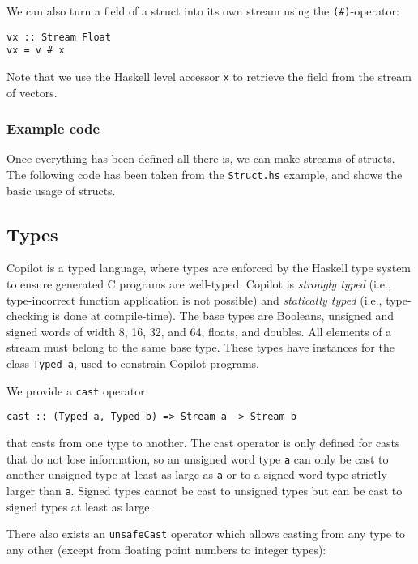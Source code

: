 We can also turn a field of a struct into its own stream using the
\texttt{(\#)}-operator:
\begin{lstlisting}[language=Copilot]
vx :: Stream Float
vx = v # x
\end{lstlisting}
Note that we use the Haskell level accessor \texttt{x} to retrieve the field
from the stream of vectors.


\subsubsection*{Example code}
\label{exm:struct}
Once everything has been defined all there is, we can make streams of structs. The following
code has been taken from the \texttt{Struct.hs} example, and shows the basic
usage of structs.
%

%

\subsection{Types} \label{sec:types}

Copilot is a typed language, where types are enforced by the Haskell type system
to ensure generated C programs are well-typed.  Copilot is \emph{strongly typed}
(i.e., type-incorrect function application is not possible) and \emph{statically
  typed} (i.e., type-checking is done at compile-time).  The base types are
Booleans, unsigned and signed words of width 8, 16, 32, and 64, floats, and
doubles.  All elements of a stream must belong to the same base
type.  These types have instances for the class {\tt Typed a}, used to constrain
Copilot programs.

We provide a {\tt cast} operator
%
\begin{lstlisting}[language = Copilot, frame = single]
cast :: (Typed a, Typed b) => Stream a -> Stream b
\end{lstlisting}
%
that casts from one type to another.  The cast operator is only defined for
casts that do not lose information, so an unsigned word type {\tt a} can only be
cast to another unsigned  type at least as large as {\tt a} or to a signed word
type strictly larger than {\tt a}.  Signed types cannot be cast to unsigned
types but can be cast to signed types at least as large.

There also exists an {\tt unsafeCast} operator which allows casting from any
type to any other (except from floating point numbers to integer types):

